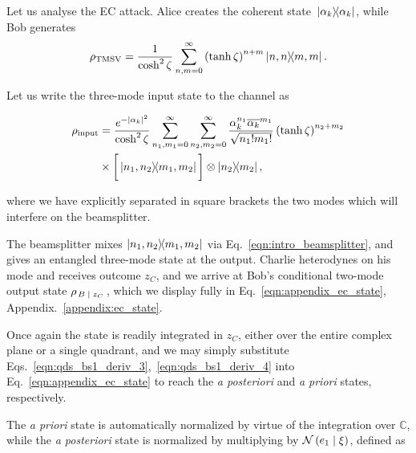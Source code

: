 
Let us analyse the EC attack. Alice creates the coherent state $\dyad*{\alpha_k}$, while Bob generates
\begin{equation}\label{eqn:qds_ec_tmsv}
\tmsv = \frac{1}{\cosh^2 \zeta}  \sum_{n, m=0}^\infty \left(\tanh\zeta\right)^{n+m} \dyad{n, n}{m, m}.
\end{equation}

\noindent Let us write the three-mode input state to the channel as

\begin{align}
\rho_{\text{input}} &= \frac{e^{-\left|\alpha_k\right|^2}}{\cosh^2 \zeta} \sum_{n_1, m_1=0}^\infty \sum_{n_2, m_2=0}^{\infty} \frac{\alpha_k^{n_1} \overline{\alpha_k}^{m_1}}{\sqrt{n_1! m_1!}} \left(\tanh\zeta\right)^{n_2 + m_2} \notag \\
&\times \bigg[\dyad{n_1, n_2}{m_1, m_2}\bigg] \otimes \dyad{n_2}{m_2},
\end{align}

\noindent where we have explicitly separated in square brackets the two modes which will interfere on the beamsplitter.

The beamsplitter mixes $\dyad{n_1, n_2}{m_1, m_2}$ via Eq.~\ref{eqn:intro_beamsplitter}, and gives an entangled three-mode state at the output. Charlie heterodynes on his mode and receives outcome $z_C$, and we arrive at Bob's conditional two-mode output state $\rho_{\left. B \; \middle| \; z_C\right.}$, which we display fully in Eq.~\ref{eqn:appendix_ec_state}, Appendix.~\ref{appendix:ec_state}. %

Once again the state is readily integrated in $z_C$, either over the entire complex plane or a single quadrant, and we may simply substitute Eqs.~\ref{eqn:qds_bs1_deriv_3},~\ref{eqn:qds_bs1_deriv_4} into Eq.~\ref{eqn:appendix_ec_state} to reach the \emph{a posteriori} and \emph{a priori} states, respectively.

The \emph{a priori} state is automatically normalized by virtue of the integration over $\mathbb{C}$, while the \emph{a posteriori} state is normalized by multiplying by $\mathcal{N}\left(e_1 \; \middle| \; \xi \right)$, defined as 

